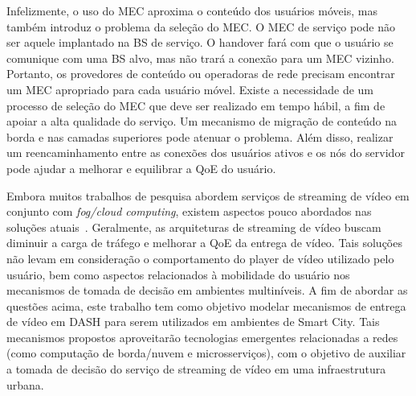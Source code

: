 
Infelizmente, o uso do MEC aproxima o conteúdo dos usuários móveis, mas também introduz o problema da seleção do MEC. O MEC de serviço pode não ser aquele implantado na BS de serviço. O handover fará com que o usuário se comunique com uma BS alvo, mas não trará a conexão para um MEC vizinho. Portanto, os provedores de conteúdo ou operadoras de rede precisam encontrar um MEC apropriado para cada usuário móvel. Existe a necessidade de um processo de seleção do MEC que deve ser realizado em tempo hábil, a fim de apoiar a alta qualidade do serviço. Um mecanismo de migração de conteúdo na borda e nas camadas superiores pode atenuar o problema. Além disso, realizar um reencaminhamento entre as conexões dos usuários ativos e os nós do servidor pode ajudar a melhorar e equilibrar a QoE do usuário.


Embora muitos trabalhos de pesquisa abordem serviços de streaming de vídeo em conjunto com \textit{fog/cloud computing}, existem aspectos pouco abordados nas soluções atuais~\cite{Mouradian2018ComSurv, bentaeb:2018:MSys}. Geralmente, as arquiteturas de streaming de vídeo buscam diminuir a carga de tráfego e melhorar a QoE da entrega de vídeo. Tais soluções não levam em consideração o comportamento do player de vídeo utilizado pelo usuário, bem como aspectos relacionados à mobilidade do usuário nos mecanismos de tomada de decisão em ambientes multiníveis. A fim de abordar as questões acima, este trabalho tem como objetivo modelar mecanismos de entrega de vídeo em DASH para serem utilizados em ambientes de Smart City. Tais mecanismos propostos aproveitarão tecnologias emergentes relacionadas a redes~ (como computação de borda/nuvem e microsserviços), com o objetivo de auxiliar a tomada de decisão do serviço de streaming de vídeo em uma infraestrutura urbana.